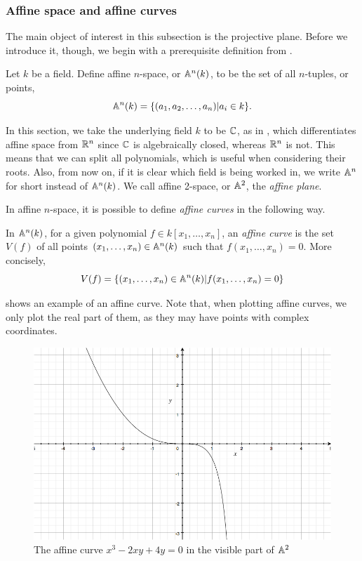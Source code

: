 \subsubsection{Affine space and affine curves}
The main object of interest in this subsection is the projective plane.
Before we introduce it, though, we begin with a prerequisite definition from \cite{323-lectures}.

\begin{definition}
	Let $k$ be a field.
	Define affine $n$-space, or $\an(k)$, to be the set of all $n$-tuples, or points,
	$$\an(k) = \{ (a_1,a_2,\ldots,a_n) | a_i \in k\}.$$
\end{definition}

In this section, we take the underlying field $k$ to be $\C$, as in \cite{bix2006,323-lectures}, which differentiates affine space from $\R^n$ since $\C$ is algebraically closed, whereas $\R^n$ is not.
This means that we can split all polynomials, which is useful when considering their roots.
Also, from now on, if it is clear which field is being worked in, we write $\an$ for short instead of $\an(k)$.
We call affine 2-space, or $\an[2]$, the \emph{affine plane}.

In affine $n$-space, it is possible to define \emph{affine curves} in the following way.
\begin{definition}
	In $\an(k)$, for a given polynomial $f \in k[x_1,\ldots,x_n]$, an \emph{affine curve} is the set $V(f)$ of all points $(x_1,\ldots,x_n) \in \an(k)$ such that $f(x_1,\ldots,x_n)=0$.
	More concisely,
	$$V(f) = \{(x_1,\ldots,x_n)\in\an(k) | f(x_1,\ldots,x_n)=0\}$$
\end{definition}
 shows an example of an affine curve.
Note that, when plotting affine curves, we only plot the real part of them, as they may have points with complex coordinates.

\begin{figure}[htbp]
	\centering
	\includegraphics[scale=0.3]{../Figures/affineexample.jpg}
	\caption{The affine curve $x^3 - 2xy + 4y = 0$ in the visible part of $\an[2]$}
	\label{affinecurveexample}
\end{figure}

